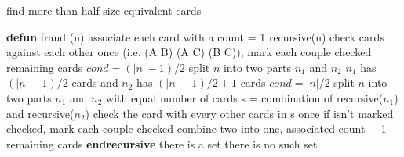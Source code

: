 \documentclass[paper=a4, fontsize=11pt]{scrartcl} %
\numberwithin{equation}{section} %
\numberwithin{figure}{section} %
\numberwithin{table}{section} %
\begin{document}
\begin{algorithm}
\caption{find more than half size equivalent cards}
\begin{algorithmic}
\STATE \textbf{defun} fraud (n)
\STATE associate each card with a count = 1
\STATE recursive(n)
	\STATE check cards against each other once (i.e. (A B) (A C) (B C)), mark each couple checked
		\RETURN remaining cards
	\ENDIF
\ENDIF
{}
	\STATE $cond = (|n|-1)/2$
	\STATE split $n$ into two parts $n_1$ and $n_2$
	\STATE $n_1$ has $(|n|-1)/2$ cards and $n_2$ has $(|n|-1)/2+1$ cards
\ELSE
	\STATE $cond = |n|/2$
	\STATE split $n$ into two parts $n_1$ and $n_2$ with equal number of cards
\ENDIF
\STATE s = combination of recursive($n_1$) and recursive($n_2$)
	\STATE check the card with every other cards in s once if isn't marked checked, mark each couple checked
	\STATE combine two into one, associated count + 1
	\ENDIF
\ENDFOR
\RETURN remaining cards
\STATE \textbf{endrecursive}
	\STATE there is a set
\ELSE
	\STATE there is no such set
\ENDIF
\end{algorithmic}
\end{algorithm}
\end{document}
